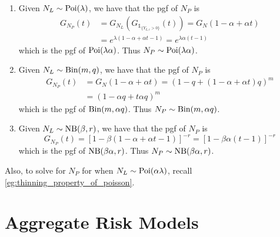 \documentclass[notoc,notitlepage]{tufte-book}
\begin{document}
\begin{solution}
  \begin{enumerate}
    \item Given $N_L \sim \operatorname{Poi}(\lambda)$, we have that the pgf of $N_P$ is
      \begin{align*}
        G_{N_P}(t) &= G_{N_L} ( G_{\mathbb{1}_{\{ Y_{L, i} > 0 \}}} (t) ) = G_N( 1 - \alpha + \alpha t ) \\
                   &= e^{\lambda ( 1 - \alpha + \alpha t - 1 )} = e^{ \lambda \alpha ( t - 1 ) }
      \end{align*}
      which is the pgf of $\operatorname{Poi}(\lambda \alpha)$. Thus $N_P \sim \operatorname{Poi}(\lambda \alpha)$.

    \item Given $N_L \sim \operatorname{Bin}(m, q)$, we have that the pgf of $N_P$ is
      \begin{align*}
        G_{N_P}(t) &= G_N( 1 - \alpha + \alpha t ) = ( 1 - q + ( 1 - \alpha + \alpha t ) q )^m \\
                   &= ( 1 - \alpha q + t \alpha q )^m
      \end{align*}
      which is the pgf of $\operatorname{Bin}(m, \alpha q)$. Thus $N_P \sim \operatorname{Bin}(m, \alpha q)$.

    \item Given $N_L \sim \operatorname{NB}(\beta, r)$, we have that the pgf of $N_P$ is
      \begin{equation*}
        G_{N_P}(t) = \left[ 1 - \beta ( 1 - \alpha + \alpha t  - 1) \right]^{-r} = \left[ 1 - \beta \alpha ( t - 1 ) \right]^{-r}
      \end{equation*}
      which is the pgf of $\operatorname{NB}(\beta \alpha, r)$. Thus $N_P \sim \operatorname{NB}(\beta \alpha, r)$.
  \end{enumerate}
\end{solution}

\begin{remark}
  Also, to solve for $N_P$ for when $N_L \sim \operatorname{Poi}(\alpha \lambda)$, recall \cref{eg:thinning_property_of_poisson}.
\end{remark}




\section{Aggregate Risk Models}%
\label{sec:aggregate_risk_models}
\end{document}
